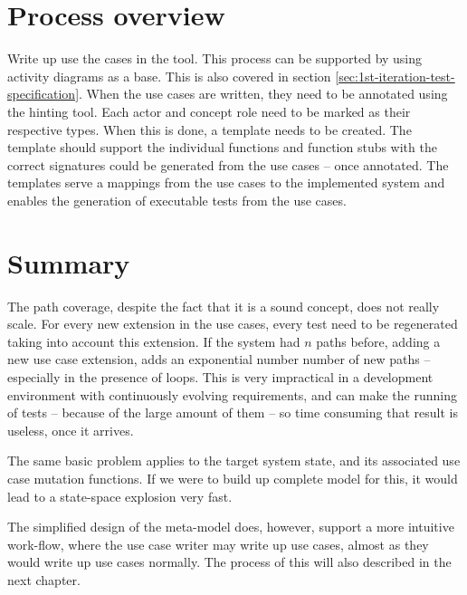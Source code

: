 \section{Process overview}
\label{sec:process-overview}
Write up use the cases in the tool. This process can be supported by using activity diagrams as a base. This is also covered in section \ref{sec:1st-iteration-test-specification}.
When the use cases are written, they need to be annotated using the hinting tool. Each actor and concept role need to be marked as their respective types.
When this is done, a template needs to be created. The template should support the individual functions and function stubs with the correct signatures could be generated from the use cases -- once annotated.
The templates serve a mappings from the use cases to the implemented system and enables the generation of executable tests from the use cases.

\section{Summary}
The path coverage, despite the fact that it is a sound concept, does not really scale. For every new extension in the use cases, every test need to be regenerated taking into account this extension. If the system had $n$ paths before, adding a new use case extension, adds an exponential number number of new paths -- especially in the presence of loops. This is very impractical in a development environment with continuously evolving requirements, and can make the running of tests -- because of the large amount of them -- so time consuming that result is useless, once it arrives.\medskip

\noindent
The same basic problem applies to the target system state, and its associated use case mutation functions. If we were to build up complete model for this, it would lead to a state-space explosion very fast.\medskip

\noindent The simplified design of the meta-model does, however, support a more intuitive work-flow, where the use case writer may write up use cases, almost as they would write up use cases normally. The process of this will also described in the next chapter.



